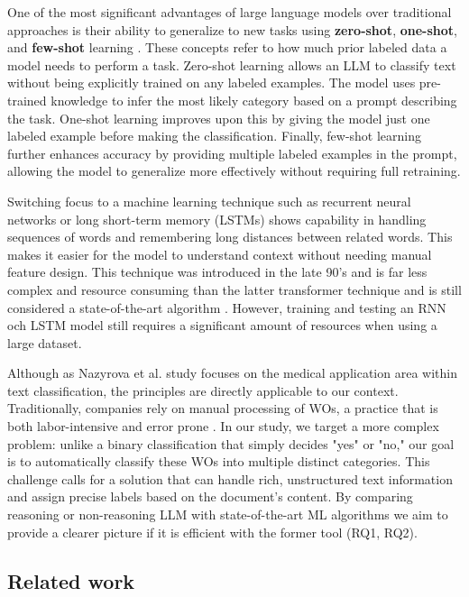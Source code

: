 One of the most significant advantages of large language models over traditional approaches is their ability to generalize to new tasks using \textbf{zero-shot}, \textbf{one-shot}, and \textbf{few-shot} learning \cite{brown2020language}. These concepts refer to how much prior labeled data a model needs to perform a task. Zero-shot learning allows an LLM to classify text without being explicitly trained on any labeled examples. The model uses pre-trained knowledge to infer the most likely category based on a prompt describing the task. One-shot learning improves upon this by giving the model just one labeled example before making the classification. Finally, few-shot learning further enhances accuracy by providing multiple labeled examples in the prompt, allowing the model to generalize more effectively without requiring full retraining.

Switching focus to a machine learning technique such as recurrent neural networks or long short-term memory (LSTMs) shows capability in handling sequences of words and remembering long distances between related words. This makes it easier for the model to understand context without needing manual feature design. This technique was introduced in the late 90's and is far less complex and resource consuming than the latter transformer technique and is still considered a state-of-the-art algorithm \cite{wang2024classifiers, hochreiter1997long}. However, training and testing an RNN och LSTM model still requires a significant amount of resources when using a large dataset.

Although as Nazyrova et al. \cite{nazyrova2024medical} study focuses on the medical application area within text classification, the principles are directly applicable to our context.  Traditionally, companies rely on manual processing of WOs, a practice that is both labor-intensive and error prone \cite{li2024work}. In our study, we target a more complex problem: unlike a binary classification that simply decides "yes" or "no," our goal is to automatically classify these WOs into multiple distinct categories. This challenge calls for a solution that can handle rich, unstructured text information and assign precise labels based on the document’s content. By comparing reasoning or non-reasoning LLM with state-of-the-art ML algorithms we aim to provide a clearer picture if it is efficient with the former tool (RQ1, RQ2).

\subsection{Related work}

